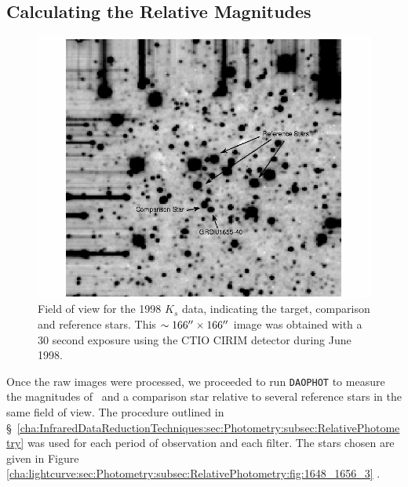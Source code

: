 
\subsection{Calculating the Relative Magnitudes}
\label{cha:lightcurve:sec:Photometry:subsec:RelativePhotometry}

\begin{figure}[!htb]
\begin{center}
\includegraphics[width=5.0in]{1648_1656_3}
\caption{%
Field of view for the 1998 $K_s$ data, indicating the target,
comparison and reference stars. This $\sim 166\hbox{$^{\prime\prime}$} \times
166\hbox{$^{\prime\prime}$}$ image was obtained with a 30 second exposure using the
CTIO CIRIM detector during June 1998. }
\label{cha:lightcurve:sec:Photometry:subsec:RelativePhotometry:fig:1648_1656_3}
\end{center}
\end{figure}

Once the raw images were processed, we proceeded to run \texttt{DAOPHOT} to measure the magnitudes of \groj\ and a comparison star relative to several reference stars in the same field of view. The procedure outlined in \S~\ref{cha:InfraredDataReductionTechniques:sec:Photometry:subsec:RelativePhotometry} was  used for each period of observation and each filter. The stars chosen are given in Figure~%
\vref{cha:lightcurve:sec:Photometry:subsec:RelativePhotometry:fig:1648_1656_3}%
. %

